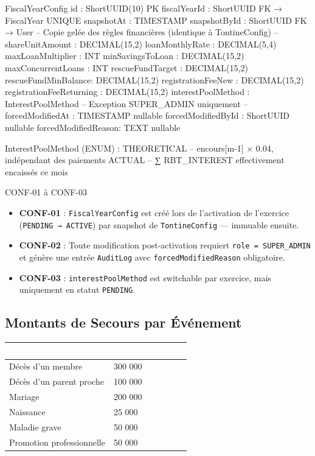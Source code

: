 \documentclass[12pt, a4paper]{report}
\begin{document}
\begin{codeBox}
FiscalYearConfig {
  id                  : ShortUUID(10)  PK
  fiscalYearId        : ShortUUID      FK → FiscalYear  UNIQUE
  snapshotAt          : TIMESTAMP
  snapshotById        : ShortUUID      FK → User
  -- Copie gelée des règles financières (identique à TontineConfig) --
  shareUnitAmount     : DECIMAL(15,2)
  loanMonthlyRate     : DECIMAL(5,4)
  maxLoanMultiplier   : INT
  minSavingsToLoan    : DECIMAL(15,2)
  maxConcurrentLoans  : INT
  rescueFundTarget    : DECIMAL(15,2)
  rescueFundMinBalance: DECIMAL(15,2)
  registrationFeeNew  : DECIMAL(15,2)
  registrationFeeReturning : DECIMAL(15,2)
  interestPoolMethod  : InterestPoolMethod
  -- Exception SUPER_ADMIN uniquement --
  forcedModifiedAt    : TIMESTAMP    nullable
  forcedModifiedById  : ShortUUID    nullable
  forcedModifiedReason: TEXT         nullable
}

InterestPoolMethod (ENUM) :
  THEORETICAL  -- encours[m-1] × 0.04, indépendant des paiements
  ACTUAL       -- ∑ RBT_INTEREST effectivement encaissés ce mois
\end{codeBox}

\begin{invariantBox}{CONF-01 à CONF-03}
\begin{itemize}
  \item \textbf{CONF-01} : \texttt{FiscalYearConfig} est créé lors de l'activation de l'exercice (\texttt{PENDING → ACTIVE})
        par snapshot de \texttt{TontineConfig} — immuable ensuite.
  \item \textbf{CONF-02} : Toute modification post-activation requiert \texttt{role = SUPER\_ADMIN}
        et génère une entrée \texttt{AuditLog} avec \texttt{forcedModifiedReason} obligatoire.
  \item \textbf{CONF-03} : \texttt{interestPoolMethod} est switchable par exercice, mais uniquement
        en statut \texttt{PENDING}.
\end{itemize}
\end{invariantBox}

\subsection{Montants de Secours par Événement}

\begin{center}
\begin{tabular}{L{6cm}R{4cm}}
  \toprule
  \textcolor{white}{\textbf{Événement}} &
  \textcolor{white}{\textbf{Montant (XAF)}} \\
  \midrule
  Décès d'un membre              & 300 000 \\
  Décès d'un parent proche       & 100 000 \\
  Mariage                        & 200 000 \\
  Naissance                      & 25 000 \\
  Maladie grave                  & 50 000 \\
  Promotion professionnelle      & 50 000 \\
  \bottomrule
\end{tabular}
\end{center}
\end{document}
